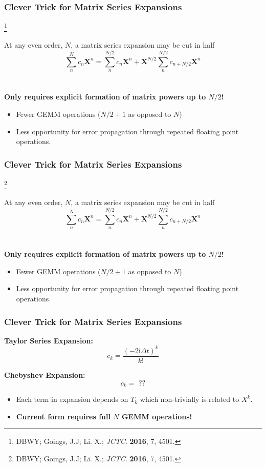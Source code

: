 \documentclass{beamer}
\newcommand\blfootnote[1]{%
  \begingroup
  \renewcommand\thefootnote{}\footnote{#1}%
  \addtocounter{footnote}{-1}%
  \endgroup
}
\begin{document}
\begin{frame}
\frametitle{Clever Trick for Matrix Series Expansions}
\blfootnote{DBWY; Goings, J.J; Li. X.; \emph{JCTC}. \textbf{2016}, 7, 4501.}

At any even order, $N$,  a matrix series expansion may be cut in half
\begin{equation*}
\sum_n^N c_n \mathbf{X}^n = \sum_n^{N/2} c_n \mathbf{X}^n + \mathbf{X}^{N/2}\sum_n^{N/2} c_{n+N/2}\mathbf{X}^n
\end{equation*}
~\\
~\\
{ \bf
Only requires explicit formation of matrix powers up to $N/2$!
}
\begin{itemize}
  \item Fewer GEMM operations ($N/2 + 1$ as opposed to $N$)
  \color{white}
  \item[\color{white}] Less opportunity for error propagation through repeated floating point operations.
\end{itemize}
\end{frame}

\begin{frame}
\frametitle{Clever Trick for Matrix Series Expansions}
\blfootnote{DBWY; Goings, J.J; Li. X.; \emph{JCTC}. \textbf{2016}, 7, 4501.}

At any even order, $N$,  a matrix series expansion may be cut in half
\begin{equation*}
\sum_n^N c_n \mathbf{X}^n = \sum_n^{N/2} c_n \mathbf{X}^n + \mathbf{X}^{N/2}\sum_n^{N/2} c_{n+N/2}\mathbf{X}^n
\end{equation*}
~\\
~\\
{ \bf
Only requires explicit formation of matrix powers up to $N/2$!
}
\begin{itemize}
  \item Fewer GEMM operations ($N/2 + 1$ as opposed to $N$)
  \item Less opportunity for error propagation through repeated floating point operations.
\end{itemize}
\end{frame}


\begin{frame}
\frametitle{Clever Trick for Matrix Series Expansions}

\textbf{Taylor Series Expansion:}
\begin{equation*}
c_k = \frac{(-2\mathrm{i}\Delta t)^k}{k!}
\end{equation*}

\color{white}
\textbf{Chebyshev Expansion:}
\begin{equation*}
c_k = \text{ ??}
\end{equation*}
\begin{itemize}
  \color{white}
  \item[\color{white}] Each term in expansion depends on $T_k$ which non-trivially is related to $X^k$.
  \item[\color{white}] \bf Current form requires full $N$ GEMM operations!
\end{itemize}
\end{frame}
\end{document}
